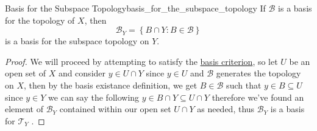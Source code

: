 \begin{proposition}{Basis for the Subspace
Topology}{basis_for_the_subspace_topology}
If \( \mathcal{ B }   \) is a basis for the topology of \( X \), then 
\[
\mathcal{ B } _{ Y } = \left\{ B \cap Y: B \in  \mathcal{ B }   \right\}  
\]
is a basis for the subspace topology on \( Y \).
\end{proposition}
\begin{proof}
    We will proceed by attempting to satisfy the
    \hyperref[lemma:basis_criterion]{basis criterion}, so let \( U \) be an open
    set of \( X \) and consider \( y \in U \cap  Y \) since \( y \in U \) and \(
    \mathcal{ B }  \) generates the topology on \( X \), then by the basis
    existance definition, we get \( B \in \mathcal{ B }   \) such that \( y \in
    B \subseteq U\) since \( y \in Y \) we can say the following \( y \in B \cap
    Y \subseteq U \cap Y\) therefore we've found an element of \( \mathcal{ B }
    _{ Y } \)  contained within our open set \( U \cap Y \) as needed, thus \(
    \mathcal{ B } _{ Y }   \) is a basis for \( \mathcal{ T } _{ Y }   \) .
\end{proof}
